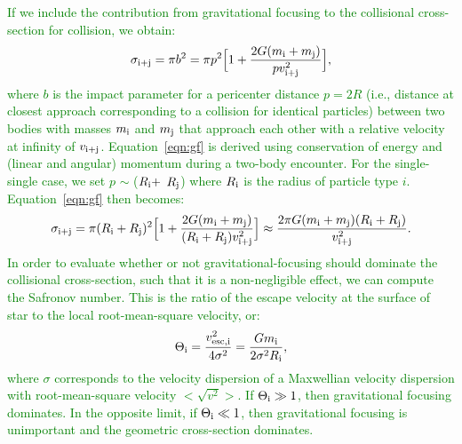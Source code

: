 \documentclass[main.tex]{subfiles}
\begin{document}
\begin{tcolorbox}[sharp corners, colback=green!30, colframe=green!80!blue, title=Gravitational Focusing II]
\par \textcolor{green} {If we include the contribution from gravitational focusing to the collisional cross-section for collision, we obtain:
\begin{equation}
\label{eqn:gf}
\sigma_{\rm i+j} = {\pi}b^2 = {\pi}p^2\Big[1 + \frac{2G(m_{\rm i} + m_{\rm j})}{pv_{\rm i+j}^2}\Big],
\end{equation}
where $b$ is the impact parameter for a pericenter distance $p = 2R$ (i.e., distance at closest approach corresponding to a collision for identical particles) between two bodies with masses $m_{\rm i}$ and $m_{\rm j}$ that approach each other with a relative velocity at infinity of $v_{\rm i+j}$.  Equation~\ref{eqn:gf} is derived using conservation of energy and (linear and angular) momentum during a two-body encounter.  For the single-single case, we 
set $p$ $\sim$ ($R_{\rm i} +$ $R_{\rm j}$)  where $R_{\rm i}$ is the radius of particle type $i$.  Equation~\ref{eqn:gf} then becomes:
\begin{equation}
\label{eqn:gf12}
\sigma_{\rm i+j} = {\pi}(R_{\rm i} + R_{\rm j})^2\Big[1 + \frac{2G(m_{\rm i} + m_{\rm j})}{(R_{\rm i} + R_{\rm j})v_{\rm i+j}^2}\Big] \approx \frac{2{\pi}G(m_{\rm i} + m_{\rm j})(R_{\rm i} + R_{\rm j})}{v_{\rm i+j}^2}.
\end{equation}
In order to evaluate whether or not gravitational-focusing should dominate the collisional cross-section, such that it is a non-negligible effect, we can compute the Safronov number.  This is the ratio of the escape velocity at the surface of star to the local root-mean-square velocity, or:
\begin{equation}
\label{eqn:safro}
\Theta_{\rm i} = \frac{{v_{\rm esc,i}^{2}}}{4\sigma^2} = \frac{Gm_{\rm i}}{2\sigma^2R_{\rm i}},
\end{equation}
where $\sigma$ corresponds to the velocity dispersion of a Maxwellian velocity dispersion with root-mean-square velocity $<\sqrt{v^2}>$.  If $\Theta_{\rm i} \gg 1$, then gravitational focusing dominates.  In the opposite limit, if $\Theta_{\rm i} \ll 1$, then gravitational focusing is unimportant and the geometric cross-section dominates.  
}
\end{tcolorbox} 
\end{document}

